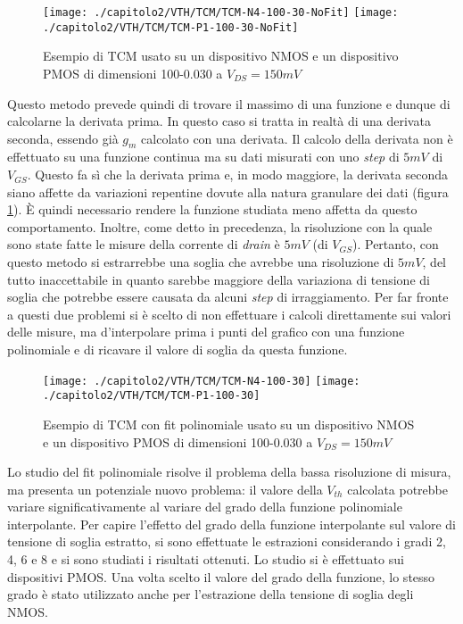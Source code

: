 \begin{figure}[h!]
  \centering
  \texttt{[image: ./capitolo2/VTH/TCM/TCM-N4-100-30-NoFit]}
  \texttt{[image: ./capitolo2/VTH/TCM/TCM-P1-100-30-NoFit]}
  \caption[Applicazione TCM senza fit polinomiale]{Esempio di TCM usato su un dispositivo NMOS e un dispositivo PMOS di dimensioni 100-0.030 a $V_{DS} = 150 mV$}
  \label{fig:TCM_NO_FIT}
\end{figure}

Questo metodo prevede quindi di trovare il massimo di una funzione e dunque di calcolarne la derivata prima. In questo caso si tratta in realtà di una derivata seconda, essendo già $g_m$ calcolato con una derivata. Il calcolo della derivata non è effettuato su una funzione continua ma su dati misurati con uno \emph{step} di $5mV$ di $V_{GS}$. Questo fa sì che la derivata prima e, in modo maggiore, la derivata seconda siano affette da variazioni repentine dovute alla natura granulare dei dati (figura \ref{fig:TCM_NO_FIT}). È quindi necessario rendere la funzione studiata meno affetta da questo comportamento. Inoltre, come detto in precedenza, la risoluzione con la quale sono state fatte le misure della corrente di \emph{drain} è $5mV$ (di $V_{GS}$). Pertanto, con questo metodo si estrarrebbe una soglia che avrebbe una risoluzione di $5mV$, del tutto inaccettabile in quanto sarebbe maggiore della variaziona di tensione di soglia che potrebbe essere causata da alcuni \emph{step} di irraggiamento.
Per far fronte a questi due problemi si è scelto di non effettuare i calcoli direttamente sui valori delle misure, ma d'interpolare prima i punti del grafico con una funzione polinomiale e di ricavare il valore di soglia da questa funzione.

\begin{figure}[ht]
  \centering
  \texttt{[image: ./capitolo2/VTH/TCM/TCM-N4-100-30]}
  \texttt{[image: ./capitolo2/VTH/TCM/TCM-P1-100-30]}
  \caption[Applicazione TCM con fit polinomiale di sesto grado]{Esempio di TCM con fit polinomiale usato su un dispositivo NMOS e un dispositivo PMOS di dimensioni 100-0.030 a $V_{DS} = 150 mV$}
  \label{fig:TCM_FIT_6}
\end{figure}

Lo studio del fit polinomiale risolve il problema della bassa risoluzione di misura, ma presenta un potenziale nuovo problema: il valore della $V_{th}$ calcolata potrebbe variare significativamente al variare del grado della funzione polinomiale interpolante. Per capire l'effetto del grado della funzione interpolante sul valore di tensione di soglia estratto, si sono effettuate le estrazioni considerando i gradi 2, 4, 6 e 8 e si sono studiati i risultati ottenuti. Lo studio si è effettuato sui dispositivi PMOS. Una volta scelto il valore del grado della funzione, lo stesso grado è stato utilizzato anche per l'estrazione della tensione di soglia degli NMOS.


